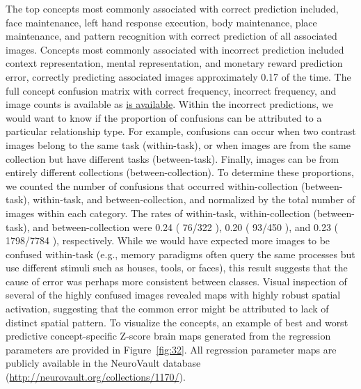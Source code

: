 \documentclass{report}
\begin{document}
The top concepts most commonly associated with correct prediction
included, face maintenance, left hand response execution, body
maintenance, place maintenance, and pattern recognition with correct prediction of all
associated images. Concepts most commonly associated with incorrect
prediction included context representation, mental representation, and monetary reward prediction error, correctly
predicting associated images approximately 0.17 of the time. The full
concept confusion matrix with correct frequency, incorrect frequency,
and image counts is available as
\href{https://github.com/vsoch/semantic-image-comparison/blob/master/update/encoding_regression_performance/classification_concept_confusion_norm_perform.tsv}{is available}. Within the incorrect predictions, we would want to know if the
proportion of confusions can be attributed to a particular relationship
type. For example, confusions can occur when two contrast images belong
to the same task (within-task), or when images are from the same
collection but have different tasks (between-task). Finally, images can
be from entirely different collections (between-collection). To
determine these proportions, we counted the number of confusions that
occurred within-collection (between-task), within-task, and
between-collection, and normalized by the total number of images within
each category. The rates of within-task, within-collection
(between-task), and between-collection were 0.24 ( 76/322 ), 0.20 (
93/450 ), and 0.23 ( 1798/7784 ), respectively. While we would have expected more
images to be confused within-task (e.g., memory paradigms often query
the same processes but use different stimuli such as houses, tools, or
faces), this result suggests that the cause of error was perhaps
more consistent between classes. Visual inspection of several of the highly
confused images revealed maps with highly robust spatial activation,
suggesting that the common error might be attributed to lack of distinct
spatial pattern. To visualize the concepts, an example of best and worst
predictive concept-specific Z-score brain maps generated from the
regression parameters are provided in Figure~\ref{fig:32}. All regression parameter
maps are publicly available in the NeuroVault database
(\href{http://neurovault.org/collections/1170/}{http://neurovault.org/collections/1170/}).
\end{document}
